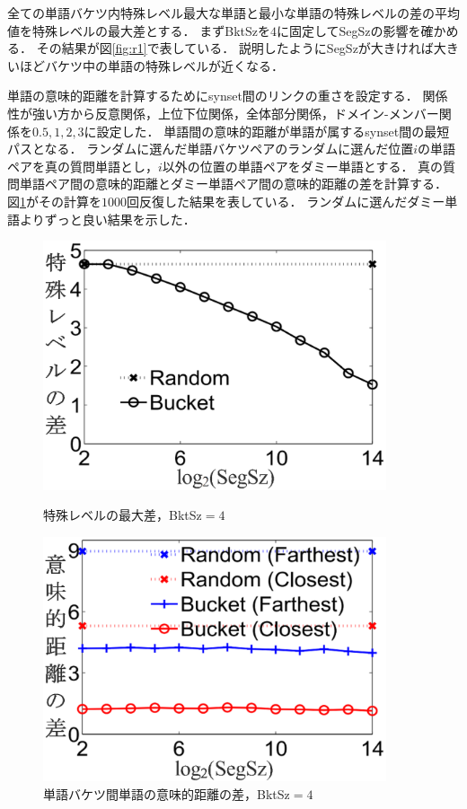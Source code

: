 \documentclass{jsarticle}
\theoremstyle{definition}
\begin{document}
全ての単語バケツ内特殊レベル最大な単語と最小な単語の特殊レベルの差の平均値を特殊レベルの最大差とする．
まずBktSzを$4$に固定してSegSzの影響を確かめる．
その結果が図\ref{fig:r1}で表している．
説明したようにSegSzが大きければ大きいほどバケツ中の単語の特殊レベルが近くなる．

単語の意味的距離を計算するためにsynset間のリンクの重さを設定する．
関係性が強い方から反意関係，上位下位関係，全体部分関係，ドメイン-メンバー関係を$0.5,1,2,3$に設定した．
単語間の意味的距離が単語が属するsynset間の最短パスとなる．
ランダムに選んだ単語バケツペアのランダムに選んだ位置$i$の単語ペアを真の質問単語とし，$i$以外の位置の単語ペアをダミー単語とする．
真の質問単語ペア間の意味的距離とダミー単語ペア間の意味的距離の差を計算する．
図\ref{fig:r2}がその計算を$1000$回反復した結果を表している．
ランダムに選んだダミー単語よりずっと良い結果を示した．

\begin{figure}
\begin{minipage}[t]{0.5\linewidth}
\centering
\includegraphics[width=0.9\textwidth]{rk17.eps}
\caption{特殊レベルの最大差，BktSz$=4$}
\label{fig:r1}
\end{minipage}%
\begin{minipage}[t]{0.5\linewidth}
\centering
\includegraphics[width=0.9\textwidth]{rk18.eps}
\caption{単語バケツ間単語の意味的距離の差，BktSz$=4$}
\label{fig:r2}
\end{minipage}
\end{figure}
\end{document}
